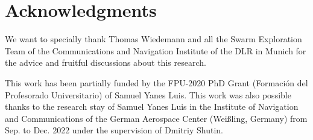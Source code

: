 \documentclass[journal]{IEEEtran}
\newcommand\changes[1]{\textcolor{black}{#1}}
\begin{document}

\section{Acknowledgments}

We want to specially thank Thomas Wiedemann and all the Swarm Exploration Team of the Communications and Navigation Institute of the DLR in Munich for the advice and fruitful discussions about this research.

This work has been partially funded by the FPU-2020 PhD Grant (Formación del Profesorado Universitario) of Samuel Yanes Luis. This work was also possible thanks to the research stay of Samuel Yanes Luis in the Institute of Navigation and Communications of the German Aerospace Center (Weißling, Germany) from Sep. to Dec. 2022 under the supervision of Dmitriy Shutin. 





\end{document}
